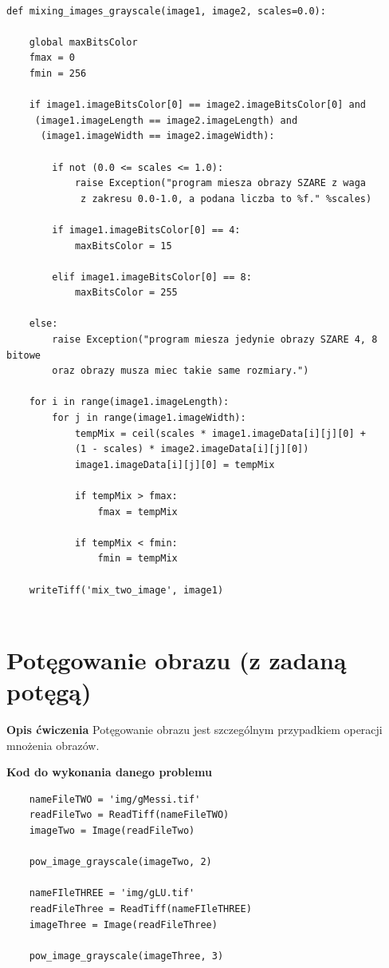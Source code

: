 \documentclass[magisterska,openany]{pracadypl}
\begin{document}
\lstset{language=Python}
\vspace{0.25cm}
\begin{lstlisting}[caption={Mieszanie obrazów z okreslonym współczynnikiem}]

def mixing_images_grayscale(image1, image2, scales=0.0):

    global maxBitsColor
    fmax = 0
    fmin = 256

    if image1.imageBitsColor[0] == image2.imageBitsColor[0] and
     (image1.imageLength == image2.imageLength) and
      (image1.imageWidth == image2.imageWidth):

        if not (0.0 <= scales <= 1.0):
            raise Exception("program miesza obrazy SZARE z waga
             z zakresu 0.0-1.0, a podana liczba to %f." %scales)

        if image1.imageBitsColor[0] == 4:
            maxBitsColor = 15

        elif image1.imageBitsColor[0] == 8:
            maxBitsColor = 255

    else:
        raise Exception("program miesza jedynie obrazy SZARE 4, 8 bitowe 
        oraz obrazy musza miec takie same rozmiary.")

    for i in range(image1.imageLength):
        for j in range(image1.imageWidth):
            tempMix = ceil(scales * image1.imageData[i][j][0] +
            (1 - scales) * image2.imageData[i][j][0])
            image1.imageData[i][j][0] = tempMix

            if tempMix > fmax:
                fmax = tempMix

            if tempMix < fmin:
                fmin = tempMix

    writeTiff('mix_two_image', image1)
        
\end{lstlisting}
\newpage


\section{Potęgowanie obrazu (z zadaną potęgą)}

\vspace{0.5cm}\textbf{\Large Opis ćwiczenia}
\vspace{0.25cm}\newline
Potęgowanie obrazu jest szczególnym przypadkiem operacji mnożenia obrazów.
\newline
\newline

\vspace{0.5cm}
\textbf{\Large Kod do wykonania danego problemu}
\lstset{language=Python}
\vspace{0.25cm}
\begin{lstlisting}
	nameFileTWO = 'img/gMessi.tif'
	readFileTwo = ReadTiff(nameFileTWO)
	imageTwo = Image(readFileTwo)

	pow_image_grayscale(imageTwo, 2)
	
	nameFIleTHREE = 'img/gLU.tif'
	readFileThree = ReadTiff(nameFIleTHREE)
	imageThree = Image(readFileThree)
	
	pow_image_grayscale(imageThree, 3)

\end{lstlisting}
\end{document}

